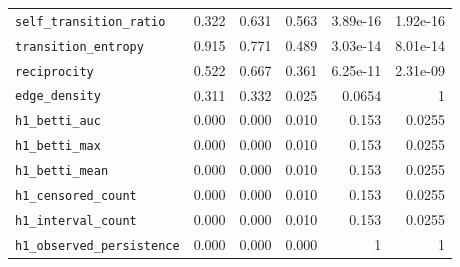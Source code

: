 \documentclass{article}
\begin{document}
\begin{table}[htbp]
\begin{tabular}{lrrrrr}
\rowcolor{green!15}\verb|self_transition_ratio|   &            0.322 &             0.631 &        0.563 &  3.89e-16 &  1.92e-16 \\
\rowcolor{green!15}\verb|transition_entropy|      &            0.915 &             0.771 &        0.489 &  3.03e-14 &  8.01e-14 \\
\rowcolor{green!15}\verb|reciprocity|             &            0.522 &             0.667 &        0.361 &  6.25e-11 &  2.31e-09 \\
\verb|edge_density|            &            0.311 &             0.332 &        0.025 &    0.0654 &         1 \\
\rowcolor{orange!15}\verb|h1_betti_auc|            &            0.000 &             0.000 &        0.010 &     0.153 &    0.0255 \\
\rowcolor{orange!15}\verb|h1_betti_max|            &            0.000 &             0.000 &        0.010 &     0.153 &    0.0255 \\
\rowcolor{orange!15}\verb|h1_betti_mean|           &            0.000 &             0.000 &        0.010 &     0.153 &    0.0255 \\
\rowcolor{orange!15}\verb|h1_censored_count|       &            0.000 &             0.000 &        0.010 &     0.153 &    0.0255 \\
\rowcolor{orange!15}\verb|h1_interval_count|       &            0.000 &             0.000 &        0.010 &     0.153 &    0.0255 \\
\verb|h1_observed_persistence| &            0.000 &             0.000 &        0.000 &         1 &         1 \\
\bottomrule
\end{tabular}
\end{table}

\end{document}
